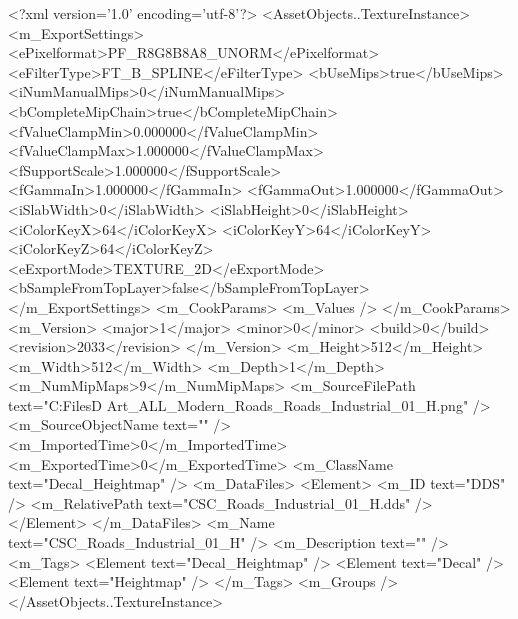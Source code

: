 <?xml version='1.0' encoding='utf-8'?>
<AssetObjects..TextureInstance>
  <m_ExportSettings>
    <ePixelformat>PF_R8G8B8A8_UNORM</ePixelformat>
    <eFilterType>FT_B_SPLINE</eFilterType>
    <bUseMips>true</bUseMips>
    <iNumManualMips>0</iNumManualMips>
    <bCompleteMipChain>true</bCompleteMipChain>
    <fValueClampMin>0.000000</fValueClampMin>
    <fValueClampMax>1.000000</fValueClampMax>
    <fSupportScale>1.000000</fSupportScale>
    <fGammaIn>1.000000</fGammaIn>
    <fGammaOut>1.000000</fGammaOut>
    <iSlabWidth>0</iSlabWidth>
    <iSlabHeight>0</iSlabHeight>
    <iColorKeyX>64</iColorKeyX>
    <iColorKeyY>64</iColorKeyY>
    <iColorKeyZ>64</iColorKeyZ>
    <eExportMode>TEXTURE_2D</eExportMode>
    <bSampleFromTopLayer>false</bSampleFromTopLayer>
  </m_ExportSettings>
  <m_CookParams>
    <m_Values />
  </m_CookParams>
  <m_Version>
    <major>1</major>
    <minor>0</minor>
    <build>0</build>
    <revision>2033</revision>
  </m_Version>
  <m_Height>512</m_Height>
  <m_Width>512</m_Width>
  <m_Depth>1</m_Depth>
  <m_NumMipMaps>9</m_NumMipMaps>
  <m_SourceFilePath text="C:\Users\Shadow\Desktop\Working Files\3D Art\Decals\CSC_ALL_Modern_Roads\textures\CSC_Roads_Industrial_01_H.png" />
  <m_SourceObjectName text="" />
  <m_ImportedTime>0</m_ImportedTime>
  <m_ExportedTime>0</m_ExportedTime>
  <m_ClassName text="Decal_Heightmap" />
  <m_DataFiles>
    <Element>
      <m_ID text="DDS" />
      <m_RelativePath text="CSC_Roads_Industrial_01_H.dds" />
    </Element>
  </m_DataFiles>
  <m_Name text="CSC_Roads_Industrial_01_H" />
  <m_Description text="" />
  <m_Tags>
    <Element text="Decal_Heightmap" />
    <Element text="Decal" />
    <Element text="Heightmap" />
  </m_Tags>
  <m_Groups />
</AssetObjects..TextureInstance>